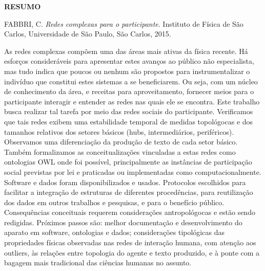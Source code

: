 \documentclass[a4paper,openright,12pt]{report} %
\begin{document}
\begin{singlespace}

\centerline{\LARGE{{\bf RESUMO}}}

\vspace*{1.5cm}

\hspace*{-0.9cm} FABBRI, C. \textit{Redes complexas para o participante}. 
Instituto de Física de São Carlos, Universidade de São Paulo, São Carlos, 2015. 

\vspace*{1.2cm}

\hspace*{-0.9cm}

{\noindent
	As redes complexas compõem uma das áreas mais ativas da física recente.
	Há esforços consideráveis para apresentar estes avanços ao público não especialista, mas tudo indica
	que poucos ou nenhum são propostos para instrumentalizar o indivíduo que constitui estes sistemas a se beneficiarem.
	Ou seja, com um núcleo de conhecimento da área, e receitas para aproveitamento,
	fornecer meios para o participante interagir e entender as redes nas quais ele se encontra.
	Este trabalho busca realizar tal tarefa por meio das redes sociais do participante.
	Verificamos que tais redes exibem uma estabilidade temporal de medidas topológocas e dos
	tamanhos relativos dos setores básicos (hubs, intermediários, periféricos).
	Observamos uma diferenciação da produção de texto de cada setor básico.
	Também formalizamos as conceitualizações vinculadas a estas redes como ontologias OWL onde foi possível,
	principalmente as instâncias de participação social previstas por lei e praticadas ou implementadas como computacionalmente.
	Software e dados foram disponibilizados e usados. Protocolos escolhidos para
	facilitar a integração de estruturas de diferentes procedências,
	para reutilização dos dados em outros trabalhos e pesquisas, e para o benefício público.
	Consequências conceituais requerem considerações antropológocas e estão sendo redigidas.
	Próximos passos são: melhor documentação e desenvolvimento do aparato em software, ontologias e dados;
	considerações tipológicas das propriedades físicas observadas nas redes de interação humana, com
	atenção aos outliers, às relações entre topologia do agente e texto produzido, e à ponte com
	a bagagem mais tradicional das ciências humanas no assunto.
}


\end{singlespace}
\end{document}
